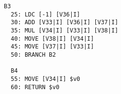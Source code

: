 \documentclass[8pt,a4paper,compress]{beamer}
\begin{document}
\begin{frame}[fragile]
\begin{lstlisting}[language={},style=focusin]
  B3                                                                                                                                                                                                                                          
  25: LDC [-1] [V36|I]                                                                                                                                                                                                                        
  30: ADD [V33|I] [V36|I] [V37|I]                                                                                                                                                                                                             
  35: MUL [V34|I] [V33|I] [V38|I]                                                                                                                                                                                                             
  40: MOVE [V38|I] [V34|I]                                                                                                                                                                                                                    
  45: MOVE [V37|I] [V33|I]                                                                                                                                                                                                                    
  50: BRANCH B2                                                                                                                                                                                                                               
                                                                                                                                                                                                                                              
  B4                                                                                                                                                                                                                                          
  55: MOVE [V34|I] $v0
  60: RETURN $v0
\end{lstlisting}
\end{frame}
\end{document}
